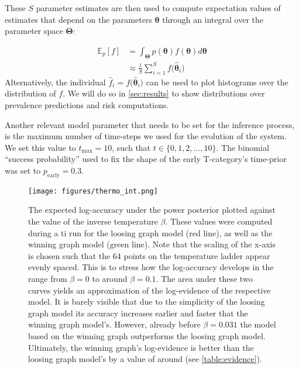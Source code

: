 \documentclass[twocolumn]{aastex631}
\begin{document}
These $S$ parameter estimates are then used to compute expectation values of estimates that depend on the parameters $\boldsymbol{\theta}$ through an integral over the parameter space $\boldsymbol{\Theta}$:

\begin{equation}
    \begin{aligned}
        \mathbb{E}_p \left[ f \right] &= \int_{\boldsymbol{\Theta}} p(\boldsymbol{\theta}) f(\boldsymbol{\theta}) d\boldsymbol{\theta} \\
        &\approx \frac{1}{S} \sum_{i=1}^S f \big( \boldsymbol{\hat{\theta}}_i \big)
    \end{aligned}
\end{equation}
%
Alternatively, the individual $\hat{f}_i = f\big( \boldsymbol{\hat{\theta}}_i \big)$ can be used to plot histograms over the distribution of $f$. We will do so in \autoref{sec:results} to show distributions over prevalence predictions and risk computations.

Another relevant model parameter that needs to be set for the inference process, is the maximum number of time-steps we used for the evolution of the system. We set this value to $t_\text{max} = 10$, such that $t \in \{ 0, 1, 2, \ldots, 10 \}$. The binomial ``success probability'' used to fix the shape of the early T-category's time-prior was set to $p_\text{early} = 0.3$.

\begin{figure}[t]
    \centering
    \texttt{[image: figures/thermo\_int.png]}
    \caption{The expected log-accuracy under the power posterior plotted against the value of the inverse temperature $\beta$. These values were computed during a \gls{ti} run for the loosing graph model (red line), as well as the winning graph model (green line). Note that the scaling of the x-axis is chosen such that the 64 points on the temperature ladder appear evenly spaced. This is to stress how the log-accuracy develops in the range from $\beta=0$ to around $\beta=0.1$. The area under these two curves yields an approximation of the log-evidence of the respective model. It is barely visible that due to the simplicity of the loosing graph model its accuracy increases earlier and faster that the winning graph model's. However, already before $\beta=0.031$ the model based on the winning graph outperforms the loosing graph model. Ultimately, the winning graph's log-evidence is better than the loosing graph model's by a value of around (see \autoref{table:evidence}). \label{fig:thermo_int}}
\end{figure}
\end{document}
